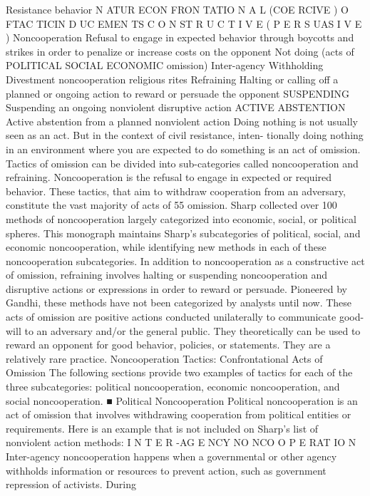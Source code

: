 \documentclass[twoside,a4paper,12pt,fleqn,openany]{extbook}
\begin{document}
Resistance
behavior
N ATUR ECON FRON TATIO N A L
(COE RCIVE )
O FTAC TICIN D UC EMEN TS
C O N ST R U C T I V E
( P E R S UAS I V E )
Noncooperation
Refusal to engage in expected behavior
through boycotts and strikes in order to penalize
or increase costs on the opponent
Not doing
(acts of
POLITICAL
 SOCIAL
 ECONOMIC
omission)
Inter-agency
 Withholding
 Divestment
noncooperation
 religious rites
Refraining
Halting or calling off a planned or ongoing action
to reward or persuade the opponent
SUSPENDING
Suspending an
ongoing nonviolent
disruptive action
ACTIVE ABSTENTION
Active abstention
from a planned
nonviolent action
Doing nothing is not usually seen as an act. But in the context of civil resistance, inten-
tionally doing nothing in an environment where you are expected to do something is an act
of omission. Tactics of omission can be divided into sub-categories called noncooperation
and refraining.
Noncooperation is the refusal to engage in expected or required behavior. These tactics,
that aim to withdraw cooperation from an adversary, constitute the vast majority of acts of
55
omission. Sharp collected over 100 methods of noncooperation largely categorized into
economic, social, or political spheres. This monograph maintains Sharp’s subcategories of
political, social, and economic noncooperation, while identifying new methods in each of
these noncooperation subcategories.
In addition to noncooperation as a constructive act of omission, refraining involves halting
or suspending noncooperation and disruptive actions or expressions in order to reward or
persuade. Pioneered by Gandhi, these methods have not been categorized by analysts until
now. These acts of omission are positive actions conducted unilaterally to communicate
good-will to an adversary and/or the general public. They theoretically can be used to reward
an opponent for good behavior, policies, or statements. They are a relatively rare practice.
Noncooperation Tactics: Confrontational Acts of Omission
The following sections provide two examples of tactics for each of the three subcategories:
political noncooperation, economic noncooperation, and social noncooperation.
■ Political Noncooperation
Political noncooperation is an act of omission that involves withdrawing cooperation from
political entities or requirements. Here is an example that is not included on Sharp’s list of
nonviolent action methods:
I N T E R -AG E NCY NO NCO O P E RAT IO N
Inter-agency noncooperation happens when a governmental or other agency withholds
information or resources to prevent action, such as government repression of activists. During
\end{document}
